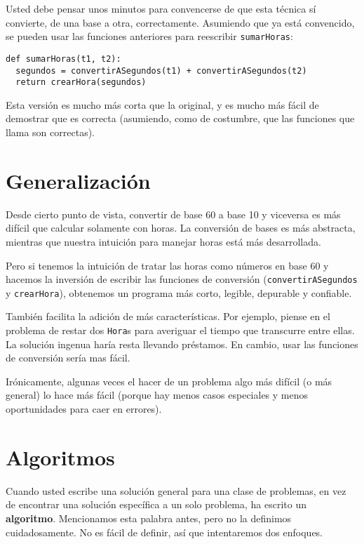 Usted debe pensar unos minutos para convencerse de que esta técnica
sí convierte, de una base a otra, correctamente. Asumiendo que ya
está convencido, se pueden usar las funciones anteriores para reescribir
\texttt{sumarHoras}:

\begin{lstlisting}
def sumarHoras(t1, t2):
  segundos = convertirASegundos(t1) + convertirASegundos(t2)
  return crearHora(segundos)
\end{lstlisting}
 Esta versión es mucho más corta que la original, y es mucho más fácil
de demostrar que es correcta (asumiendo, como de costumbre, que las
funciones que llama son correctas).

\section{Generalización}


Desde cierto punto de vista, convertir de base 60 a base 10 y viceversa
es más difícil que calcular solamente con horas. La conversión de
bases es más abstracta, mientras que nuestra intuición para manejar
horas está más desarrollada.

Pero si tenemos la intuición de tratar las horas como números en base
60 y hacemos la inversión de escribir las funciones de conversión
(\texttt{convertirASegundos} y \texttt{crearHora}), obtenemos un programa
más corto, legible, depurable y confiable.

También facilita la adición de más características. Por ejemplo, piense
en el problema de restar dos \texttt{Hora}s para averiguar el tiempo
que transcurre entre ellas. La solución ingenua haría resta llevando
préstamos. En cambio, usar las funciones de conversión sería mas fácil.

Irónicamente, algunas veces el hacer de un problema algo más difícil
(o más general) lo hace más fácil (porque hay menos casos especiales
y menos oportunidades para caer en errores).

\section{Algoritmos}


Cuando usted escribe una solución general para una clase de problemas,
en vez de encontrar una solución específica a un solo problema, ha
escrito un \textbf{algoritmo}. Mencionamos esta palabra antes, pero
no la definimos cuidadosamente. No es fácil de definir, así que intentaremos
dos enfoques.

